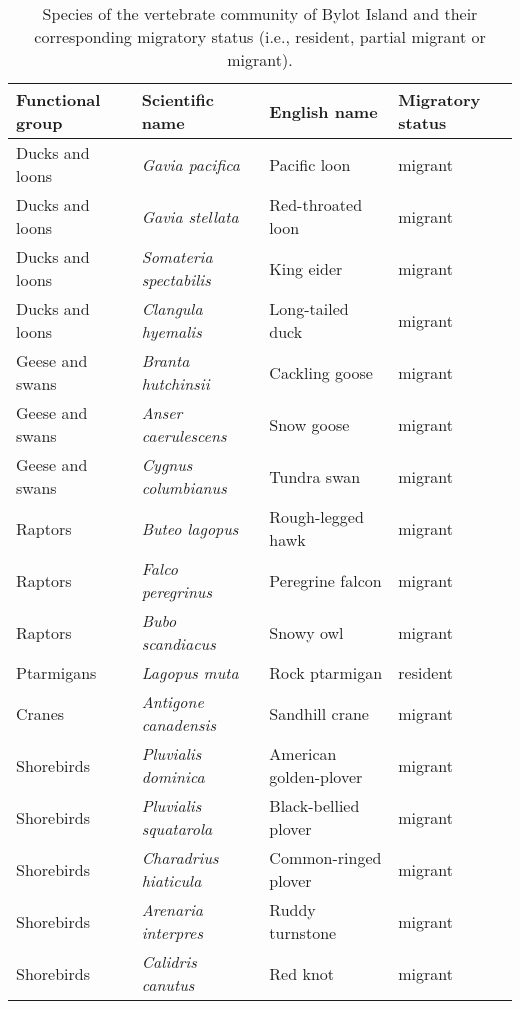 \begin{table}[ht]
\centering
\caption{Species of the vertebrate community of Bylot Island and their corresponding migratory status (i.e., resident, partial migrant or migrant).} 
\label{table:table_species_name_strategy}
\begingroup\fontsize{10pt}{10pt}\selectfont
\begin{tabularx}{0.97\textwidth}{llll}
  \hline
{\textbf{Functional group}} & {\textbf{Scientific name}} & {\textbf{English name}} & {\textbf{Migratory status}} \\ 
  \hline
Ducks and loons  & {\emph{ Gavia pacifica}} & Pacific loon & migrant \\ 
  Ducks and loons  & {\emph{ Gavia stellata}} & Red-throated loon & migrant \\ 
  Ducks and loons  & {\emph{ Somateria spectabilis}} & King eider & migrant \\ 
  Ducks and loons  & {\emph{ Clangula hyemalis}} & Long-tailed duck & migrant \\ 
  Geese and swans  & {\emph{ Branta hutchinsii}} & Cackling goose & migrant \\ 
  Geese and swans  & {\emph{ Anser caerulescens}} & Snow goose & migrant \\ 
  Geese and swans  & {\emph{ Cygnus columbianus}} & Tundra swan & migrant \\ 
  Raptors  & {\emph{ Buteo lagopus}} & Rough-legged hawk & migrant \\ 
  Raptors  & {\emph{ Falco peregrinus}} & Peregrine falcon & migrant \\ 
  Raptors  & {\emph{ Bubo scandiacus}} & Snowy owl & migrant \\ 
  Ptarmigans  & {\emph{ Lagopus muta}} & Rock ptarmigan & resident \\ 
  Cranes  & {\emph{ Antigone canadensis}} & Sandhill crane & migrant \\ 
  Shorebirds  & {\emph{ Pluvialis dominica}} & American golden-plover & migrant \\ 
  Shorebirds  & {\emph{ Pluvialis squatarola}} & Black-bellied plover & migrant \\ 
  Shorebirds  & {\emph{ Charadrius hiaticula}} & Common-ringed plover & migrant \\ 
  Shorebirds  & {\emph{ Arenaria interpres}} & Ruddy turnstone & migrant \\ 
  Shorebirds  & {\emph{ Calidris canutus}} & Red knot & migrant \\ 

\end{tabularx}
\end{table}
